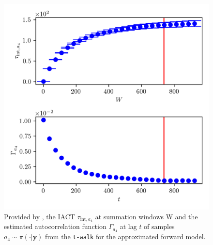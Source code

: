 \begin{figure}[ht!]
	\centering
	\includegraphics{UwerrTauIntTWalk13.png}
	\caption[IACT and autocorrelation function of samples $a_4 \sim \pi(\cdot|\bm{y})$, for approximated model.]{Provided by \cite{drikHesse}, the IACT $\tau_{\text{int},a_4}$ at summation windows W and the estimated autocorrelation function $\Gamma_{a_4}$ at lag $t$ of samples $a_4 \sim \pi( \cdot| \bm{y})$ from the \texttt{t-walk} for the approximated forward model.}
	\label{fig:TWalkIATC14}
\end{figure}
